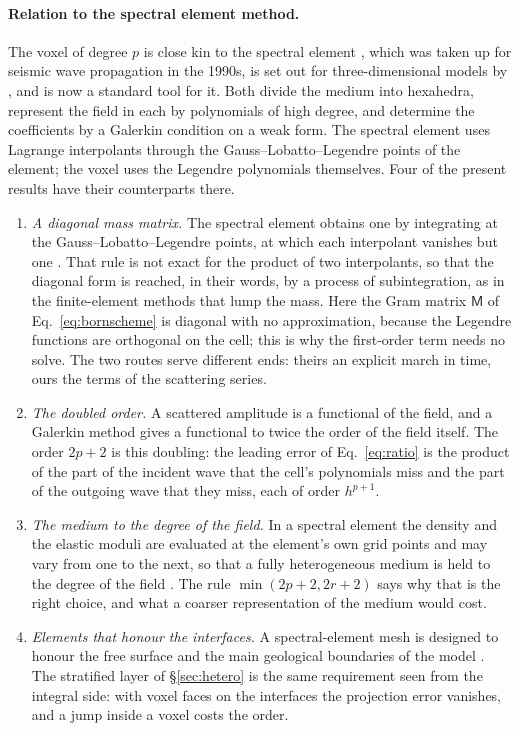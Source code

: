 \documentclass[11pt,a4paper]{article}
\begin{document}
\paragraph{Relation to the spectral element method.} The voxel of degree $p$ is close kin to the
spectral element \citep{Patera1984}, which was taken up for seismic wave propagation in the 1990s, is
set out for three-dimensional models by \citet{Komatitsch1999}, and is now a standard tool for it. Both divide the medium into hexahedra,
represent the field in each by polynomials of high degree, and determine the coefficients by a Galerkin
condition on a weak form. The spectral element uses Lagrange interpolants through the
Gauss--Lobatto--Legendre points of the element; the voxel uses the Legendre polynomials themselves.
Four of the present results have their counterparts there.
\begin{enumerate}
\item \emph{A diagonal mass matrix.} The spectral element obtains one by integrating at the
Gauss--Lobatto--Legendre points, at which each interpolant vanishes but one \citep{Komatitsch1999}.
That rule is not exact for the product of two interpolants, so that the diagonal form is reached, in
their words, by a process of subintegration, as in the finite-element methods that lump the mass. Here
the Gram matrix $\mathsf{M}$ of Eq.~\eqref{eq:bornscheme} is diagonal with no approximation, because
the Legendre functions are orthogonal on the cell; this is why the first-order term needs no solve. The
two routes serve different ends: theirs an explicit march in time, ours the terms of the scattering
series.
\item \emph{The doubled order.} A scattered amplitude is a functional of the field, and a Galerkin
method gives a functional to twice the order of the field itself. The order $2p+2$ is this doubling: the
leading error of Eq.~\eqref{eq:ratio} is the product of the part of the incident wave that the cell's
polynomials miss and the part of the outgoing wave that they miss, each of order $h^{p+1}$.
\item \emph{The medium to the degree of the field.} In a spectral element the density and the elastic
moduli are evaluated at the element's own grid points and may vary from one to the next, so that a
fully heterogeneous medium is held to the degree of the field \citep{Komatitsch1999}. The rule
$\min(2p+2,2r+2)$ says why that is the right choice, and what a coarser representation of the medium
would cost.
\item \emph{Elements that honour the interfaces.} A spectral-element mesh is designed to honour the
free surface and the main geological boundaries of the model \citep{Komatitsch1999}. The stratified
layer of \S\ref{sec:hetero} is the same requirement seen from the integral side: with voxel faces on
the interfaces the projection error vanishes, and a jump inside a voxel costs the order.
\end{enumerate}
\end{document}
